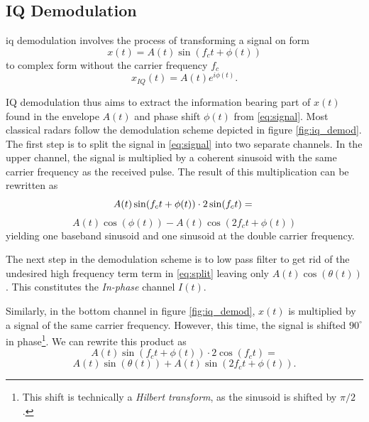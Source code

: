 
\begin{appendices}

\chapter{IQ Demodulation}

\gls{iq} demodulation involves the process of transforming a signal on form 
\begin{equation}\label{eq:signal}
	x(t)=A(t)\sin(f_c t+\phi(t))
\end{equation}
to complex form without the carrier frequency $f_c$ \citep{lee_1991}
\begin{equation}
	x_{IQ}(t) = A(t)e^{i\phi(t)}.
\end{equation}
	
IQ demodulation thus aims to extract the information bearing part of $x(t)$ found in the envelope $A(t)$ and phase shift $\phi(t)$ from \eqref{eq:signal}. Most classical radars follow the demodulation scheme depicted in figure \ref{fig:iq_demod}. The first step is to split the signal in \eqref{eq:signal} into two separate channels. In the upper channel, the signal is multiplied by a coherent sinusoid with the same carrier frequency as the received pulse. The result of this multiplication can be rewritten as
\begin{equation}
	 A(t)\sin(f_c t+\phi(t))\cdot 2\sin(f_c t) = \\
\end{equation}
\begin{equation}\label{eq:split}
	A(t)\cos(\phi(t))-A(t)\cos(2f_c t+\phi(t))
\end{equation}
yielding one baseband sinusoid and one sinusoid at the double carrier frequency. 

The next step in the demodulation scheme is to low pass filter to get rid of the undesired high frequency term term in \eqref{eq:split} leaving only $A(t)\cos(\theta(t))$. This constitutes the \emph{In-phase} channel $I(t)$.

	Similarly, in the bottom channel in figure \ref{fig:iq_demod}, $x(t)$ is multiplied by a signal of the same carrier frequency. However, this time, the signal is shifted $90^\circ$ in phase\footnote{This shift is technically a \emph{Hilbert transform}, as the sinusoid is shifted by $\pi/2$.}. We can rewrite this product as
\begin{equation}
	 A(t)\sin(f_c t+\phi(t))\cdot 2\cos(f_c t) = 
\end{equation}
\begin{equation}\label{eq:split2}
 	 A(t)\sin(\theta(t))+A(t)\sin(2f_c t+\phi(t)).
\end{equation}


\end{appendices}
